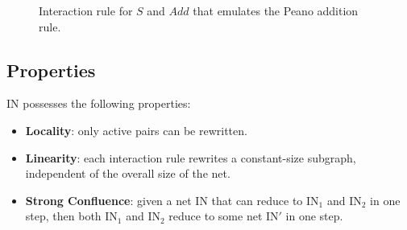 \begin{figure}[H]
	\centering
	\caption{Interaction rule for $\mathit{S}$ and $\mathit{Add}$ that emulates the Peano addition rule.}
	\label{fig:rule-concrete-zero}
\end{figure}

\subsection{Properties}
IN possesses the following properties:
\begin{itemize}
	\item \textbf{Locality}: only active pairs can be rewritten.
	\item \textbf{Linearity}: each interaction rule rewrites a constant-size subgraph, independent of
		the overall size of the net.
	\item \textbf{Strong Confluence}: given a net $\text{IN}$ that can reduce to $\text{IN}_1$ and $\text{IN}_2$ in one
		step, then both $\text{IN}_1$ and $\text{IN}_2$ reduce to some net $\text{IN}'$ in one step.
\end{itemize}
